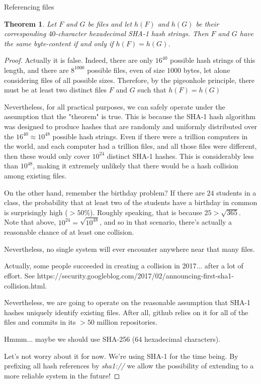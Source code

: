 \documentclass{article}
\newtheorem*{theorem*}{Theorem}
\begin{document}
\begin{section}{Referencing files}
\begin{theorem*}
Let $F$ and $G$ be files and let $h(F)$ and $h(G)$ be their corresponding $40$-character hexadecimal SHA-1 hash strings. Then
$F$ and $G$ have the same byte-content if and only if $h(F)=h(G)$.
\end{theorem*}

\begin{proof}
Actually it is false. Indeed, there are only $16^{40}$ possible hash strings of this length, and there are $8^{1000}$ possible files, even of size $1000$ bytes, let alone considering files of all possible sizes. Therefore, by the pigeonhole principle, there must be at least two distinct files $F$ and $G$ such that $h(F)=h(G)$

Nevertheless, for all practical purposes, we can safely operate under the assumption that the "theorem" is true. This is because the SHA-1 hash algorithm was designed to produce hashes that are randomly and uniformly distributed over the $16^{40}\approx 10^{48}$ possible hash strings. Even if there were a trillion computers in the world, and each computer had a trillion files, and all those files were different, then these would only cover $10^{24}$ distinct SHA-1 hashes. This is considerably less than $10^{48}$, making it extremely unlikely that there would be a hash collision among existing files.

On the other hand, remember the birthday problem? If there are $24$ students in a class, the probability that at least two of the students have a birthday in common is surprisingly high ($>50\%$). Roughly speaking, that is because $25>\sqrt{365}$. Note that above, $10^{24} = \sqrt{10^{48}}$, and so in that scenario, there's actually a reasonable chance of at least one collision.

Nevertheless, no single system will ever encounter anywhere near that many files.

Actually, some people succeeded in creating a collision in 2017... after a lot of effort. See \newline https://security.googleblog.com/2017/02/announcing-first-sha1-collision.html.

Nevertheless, we are going to operate on the reasonable assumption that SHA-1 hashes uniquely identify existing files. After all, github relies on it for all of the files and commits in its $>50$ million repositories.

Hmmm... maybe we should use SHA-256 (64 hexadecimal characters).

Let's not worry about it for now. We're using SHA-1 for the time being. By prefixing all hash references by \textit{sha1://} we allow the possibility of extending to a more reliable system in the future!

\end{proof}

\end{section}
\end{document}
